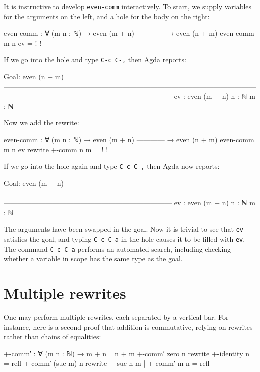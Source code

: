 It is instructive to develop \texttt{even-comm} interactively. To start,
we supply variables for the arguments on the left, and a hole for the
body on the right:

\begin{myDisplay}
even-comm : ∀ (m n : ℕ)
  → even (m + n)
    ------------
  → even (n + m)
even-comm m n ev = {! !}
\end{myDisplay}

If we go into the hole and type \texttt{C-c\ C-,} then Agda reports:

\begin{myDisplay}
Goal: even (n + m)
————————————————————————————————————————————————————————————
ev : even (m + n)
n  : ℕ
m  : ℕ
\end{myDisplay}

Now we add the rewrite:

\begin{myDisplay}
even-comm : ∀ (m n : ℕ)
  → even (m + n)
    ------------
  → even (n + m)
even-comm m n ev rewrite +-comm n m = {! !}
\end{myDisplay}

If we go into the hole again and type \texttt{C-c\ C-,} then Agda now
reports:

\begin{myDisplay}
Goal: even (m + n)
————————————————————————————————————————————————————————————
ev : even (m + n)
n  : ℕ
m  : ℕ
\end{myDisplay}

The arguments have been swapped in the goal. Now it is trivial to see
that \texttt{ev} satisfies the goal, and typing \texttt{C-c\ C-a} in the
hole causes it to be filled with \texttt{ev}. The command
\texttt{C-c\ C-a} performs an automated search, including checking
whether a variable in scope has the same type as the goal.

\hypertarget{multiple-rewrites}{%
\section{Multiple rewrites}\label{multiple-rewrites}}

One may perform multiple rewrites, each separated by a vertical bar. For
instance, here is a second proof that addition is commutative, relying
on rewrites rather than chains of equalities:

\begin{fence}
\begin{code}
+-comm′ : ∀ (m n : ℕ) → m + n ≡ n + m
+-comm′ zero    n  rewrite +-identity n             =  refl
+-comm′ (suc m) n  rewrite +-suc n m | +-comm′ m n  =  refl
\end{code}
\end{fence}

